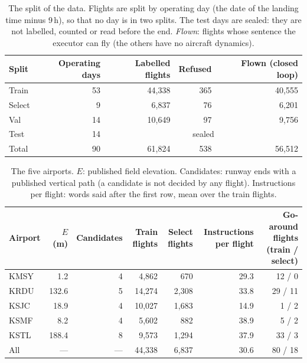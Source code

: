 
\begin{table}[t]
\centering
\caption{The split of the data. Flights are split by operating day (the date of the landing time minus 9\,h), so that no
day is in two splits. The test days are sealed: they are not labelled, counted or read before the end.
\emph{Flown}: flights whose sentence the executor can fly (the others have no aircraft dynamics).}
\label{tab:dataset-split}
\small
\renewcommand{\arraystretch}{1.2}
\begin{tabular}{@{}l r r r r@{}}
\toprule
Split & Operating days & Labelled flights & Refused & Flown (closed loop) \\
\midrule
Train  & 53 & 44{,}338 & 365 & 40{,}555 \\
Select & 9  & 6{,}837  & 76  & 6{,}201 \\
Val    & 14 & 10{,}649 & 97  & 9{,}756 \\
Test   & 14 & \multicolumn{3}{c}{sealed} \\
\midrule
Total  & 90 & 61{,}824 & 538 & 56{,}512 \\
\bottomrule
\end{tabular}
\end{table}

\begin{table}[t]
\centering
\caption{The five airports. $E$: published field elevation. Candidates: runway ends with a published vertical path (a
candidate is not decided by any flight). Instructions per flight: words said after the first row, mean over the train flights.}
\label{tab:dataset-airports}
\small
\renewcommand{\arraystretch}{1.2}
\begin{tabular}{@{}l r r r r r r@{}}
\toprule
Airport & $E$ (m) & Candidates & Train flights & Select flights & Instructions per flight & Go-around flights (train / select) \\
\midrule
KMSY & 1.2   & 4 & 4{,}862  & 670   & 29.3 & 12 / 0 \\
KRDU & 132.6 & 5 & 14{,}274 & 2{,}308 & 33.8 & 29 / 11 \\
KSJC & 18.9  & 4 & 10{,}027 & 1{,}683 & 14.9 & 1 / 2 \\
KSMF & 8.2   & 4 & 5{,}602  & 882   & 38.9 & 5 / 2 \\
KSTL & 188.4 & 8 & 9{,}573  & 1{,}294 & 37.9 & 33 / 3 \\
\midrule
All  & ---   & --- & 44{,}338 & 6{,}837 & 30.6 & 80 / 18 \\
\bottomrule
\end{tabular}
\end{table}

